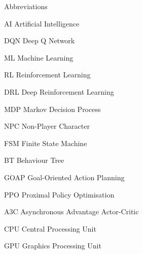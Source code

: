 
\begin{dictionary}{Abbreviations}
\item[AI]	Artificial Intelligence
\item[DQN]	Deep Q Network
\item[ML]	Machine Learning
\item[RL]	Reinforcement Learning
\item[DRL]  Deep Reinforcement Learning
\item[MDP]  Markov Decision Process
\item[NPC]	Non-Player Character
\item[FSM]	Finite State Machine
\item[BT]   Behaviour Tree
\item[GOAP] Goal-Oriented Action Planning
\item[PPO]  Proximal Policy Optimisation
\item[A3C]  Asynchronous Advantage Actor-Critic
\item[CPU]  Central Processing Unit
\item[GPU]  Graphics Processing Unit
\end{dictionary}
